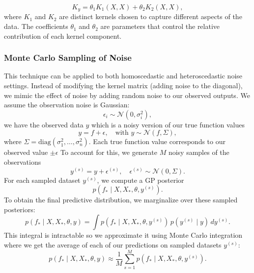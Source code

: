 \documentclass[11pt]{article}
\begin{document}
\begin{equation}
    K_y = \theta_1 K_1(X, X) + \theta_2 K_2(X, X),
    \label{eq:additive_kernel}
\end{equation}
where \( K_1 \) and \( K_2 \) are distinct kernels chosen to capture different aspects of the data. 
The coefficients \( \theta_1 \) and \( \theta_2 \) are parameters that control the relative contribution of each kernel component.

\subsubsection*{Monte Carlo Sampling of Noise}  

This technique can be applied to both homoscedastic and heteroscedastic noise settings. Instead of modifying the kernel matrix (adding noise to the diagonal), we mimic the effect of noise by adding random noise to our observed outputs.
\noindent
We assume the observation noise is Gaussian:
\[
\epsilon_i \sim \mathcal{N}(0, \sigma_i^2),
\]
we have the observed data \( y \) which is a noisy version of our true function values
\[
y = f + \epsilon, \quad \text{with } y \sim \mathcal{N}(f, \Sigma),
\]
where \( \Sigma = \mathrm{diag}(\sigma_1^2, \dots, \sigma_n^2) \).
Each true function value corresponds to our observed value \(\pm \epsilon\)
To account for this, we generate \( M \) noisy samples of the observations
\begin{equation}
    y^{(s)} = y + \epsilon^{(s)}, \quad \epsilon^{(s)} \sim \mathcal{N}(0, \Sigma).
\end{equation}
For each sampled dataset \( y^{(s)} \), we compute a GP posterior
\begin{equation}
    p(f_* \mid X, X_*, \theta, y^{(s)}).
\end{equation}
To obtain the final predictive distribution, we marginalize over these sampled posteriors:
\begin{equation}
    p(f_* \mid X, X_*, \theta, y) = \int p(f_* \mid X, X_*, \theta, y^{(s)}) \, p(y^{(s)} \mid y) \, dy^{(s)}.
\end{equation}
This integral is intractable so we approximate it using Monte Carlo integration where we get the average of each of our predictions on sampled datasets \(y^{(s)}\):
\begin{equation}
    p(f_* \mid X, X_*, \theta, y) \approx \frac{1}{M} \sum_{s=1}^{M} p(f_* \mid X, X_*, \theta, y^{(s)}).
\end{equation}
\end{document}
